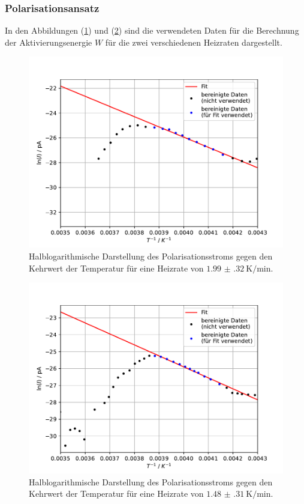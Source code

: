 \subsubsection{Polarisationsansatz}
In den Abbildungen (\ref{fig:3}) und (\ref{fig:4}) sind die verwendeten Daten für die Berechnung der Aktivierungsenergie $W$ für die zwei verschiedenen Heizraten dargestellt.
\begin{figure}[h!]
  \centering
  \includegraphics[scale=0.8]{fig/plot3.pdf}
  \caption{Halblogarithmische Darstellung des Polarisationsstroms gegen den Kehrwert der Temperatur für eine Heizrate von $\SI{1.99(32)}{\kelvin\per\minute}$.}
  \label{fig:3}
\end{figure}
\begin{figure}[h!]
  \centering
  \includegraphics[scale=0.8]{fig/plot4.pdf}
  \caption{Halblogarithmische Darstellung des Polarisationsstroms gegen den Kehrwert der Temperatur für eine Heizrate von $\SI{1.48(31)}{\kelvin\per\minute}$.}
  \label{fig:4}
\end{figure}
